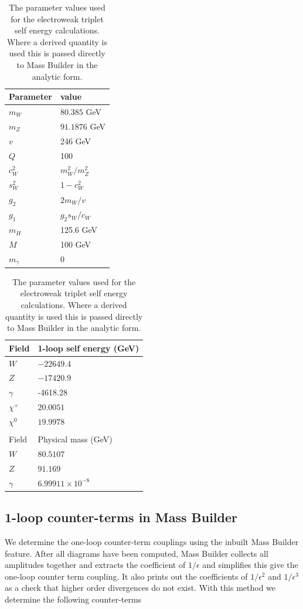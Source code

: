 \documentclass[11pt]{article}
\begin{document}
\begin{table}[tp]
\caption{The parameter values used for the electroweak triplet self energy calculations.  Where a derived quantity is used this is passed directly to Mass Builder in the analytic form.}\label{table:input_params}
\centering
\begin{tabular}{l l}
\hline
Parameter & value\\
\hline
$m_W$ & $80.385$ GeV \\
$m_Z$ & $91.1876$ GeV \\
$v$ & 246 GeV \\
$Q$ & 100 \\
$c_W^2$ & $m^2_W/m^2_Z$ \\
$s_W^2$ & $1-c^2_W$ \\
$g_2$ & $2m_W/v$\\
$g_1$ & $g_2 s_W/c_W$\\
$m_H$ & 125.6 GeV\\
$M$ & 100 GeV\\
$m_{\gamma}$ & 0 \\
\hline\end{tabular}
\hspace{3cm}
\begin{tabular}{l l}
\hline
Field & 1-loop self energy (GeV)\\
\hline
$W$ & $-22649.4$ \\
$Z$ & $-17420.9$  \\
$\gamma$ & -4618.28 \\
$\chi^+$ & $20.0051$ \\
$\chi^0$ & $19.9978$ \\
&\\
\hline
Field & Physical mass (GeV)\\
\hline
$W$ & $80.5107$ \\
$Z$ & $91.169$  \\
$\gamma$ & $6.99911\times 10^{-8}$\\
\hline\end{tabular}
\end{table}

\subsection{1-loop counter-terms in Mass Builder}

We determine the one-loop counter-term couplings using the inbuilt Mass Builder feature.  After all diagrams have been computed, Mass Builder collects all amplitudes together and extracts the coefficient of $1/\epsilon$ and simplifies this give the one-loop counter term coupling.  It also prints out the coefficients of $1/\epsilon^2$ and $1/\epsilon^3$ as a check that higher order divergences do not exist.  With this method we determine the following counter-terms
\end{document}
